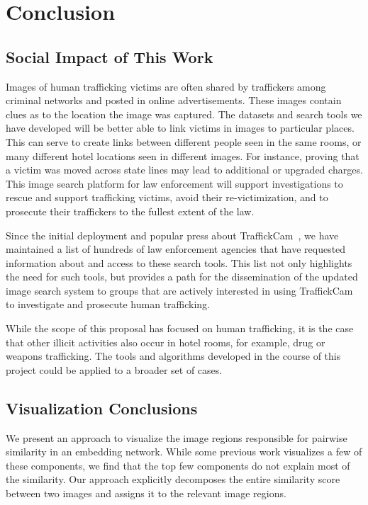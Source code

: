 
\chapter{Conclusion}
\label{ch:8}

\section{Social Impact of This Work}
Images of human trafficking victims are often shared by traffickers among criminal networks and posted in online advertisements. These images contain clues as to the location the image was captured. The datasets and search tools we have developed will be better able to link victims in images to particular places. This can serve to create links between different people seen in the same rooms, or many different hotel locations seen in different images. For instance, proving that a victim was moved across state lines may lead to additional or upgraded charges. This image search platform for law enforcement will support investigations to rescue and support trafficking victims, avoid their re-victimization, and to prosecute their traffickers to the fullest extent of the law. 

Since the initial deployment and popular press about TraffickCam~\cite{cnn,techcrunch,washingtonpost}, we have maintained a list of hundreds of law enforcement agencies that have requested information about and access to these search tools. This list not only highlights the need for such tools, but provides a path for the dissemination of the updated image search system to groups that are actively interested in using TraffickCam to investigate and prosecute human trafficking.

While the scope of this proposal has focused on human trafficking, it is the case that other illicit activities also occur in hotel rooms, for example, drug or weapons trafficking. The tools and algorithms developed in the course of this project could be applied to a broader set of cases.

\section{Visualization Conclusions}
We present an approach to visualize the image regions responsible for pairwise similarity in an embedding network.  While some previous work visualizes a few of these components, we find that the top few components do not explain most of the similarity.  Our approach explicitly decomposes the entire similarity score between two images and assigns it to the relevant image regions.

